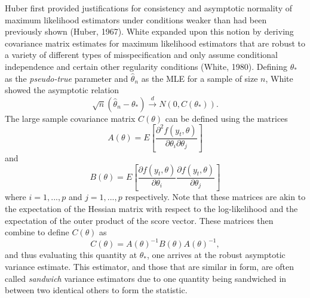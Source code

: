 		Huber first provided justifications for consistency and asymptotic normality of maximum likelihood estimators under conditions weaker than had been previously shown (Huber, 1967). White
		expanded upon this notion by deriving covariance matrix estimates for maximum likelihood estimators that are robust to a variety of different types of misspecification and only assume
		conditional independence and certain other regularity conditions (White, 1980). Defining $\theta_*$ as the \textit{pseudo-true} parameter and $\hat{\theta}_n$ as the MLE for a sample of size
		$n$, White showed the asymptotic relation
		\begin{equation*}
			\sqrt{n} (\hat{\theta}_n - \theta_*) \xrightarrow[]{d} N(0, C(\theta_* ) ) .
		\end{equation*}
		The large sample covariance matrix $C(\theta)$ can be defined using the matrices 
		\begin{equation*}
			A(\theta) = E \left[ \frac{\partial^2 f(y_t,\theta)}{\partial \theta_i \partial \theta_j} \right] 
		\end{equation*}
		and
		\begin{equation*}
			B(\theta) = E \left[ \frac{\partial f(y_t,\theta)}{\partial \theta_i} \frac{\partial f(y_t,\theta)}{\partial \theta_j} \right] 
		\end{equation*}
		where $i = 1,...,p$ and $j = 1,...,p$ respectively. Note that these matrices are akin to the expectation of the Hessian matrix with respect to the log-likelihood and the expectation of
		the outer product of the score vector. These matrices then combine to define $C(\theta)$ as
		\begin{equation*}
			C(\theta) = A(\theta)^{-1} B(\theta) A(\theta)^{-1} ,
		\end{equation*}
		and thus evaluating this quantity at $\theta_*$, one arrives at the robust asymptotic variance estimate. This estimator, and those that are similar in form, are often called \textit{sandwich}
		variance estimators due to one quantity being sandwiched in between two identical others to form the statistic.

